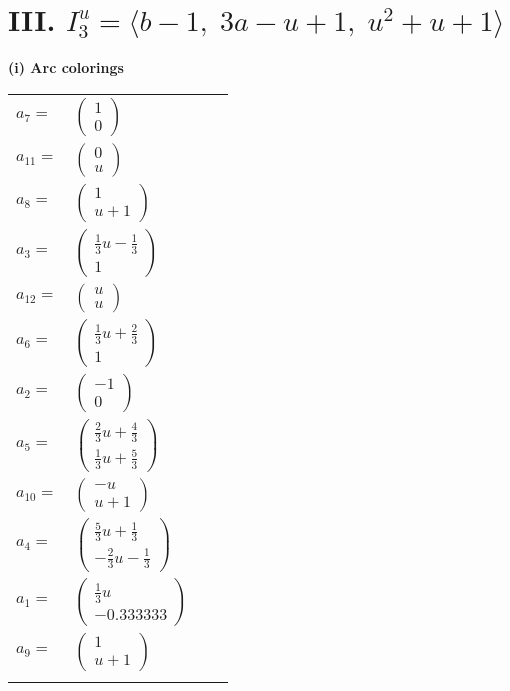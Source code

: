 \documentclass[1p]{elsarticle_modified}
\theoremstyle{definition}
\begin{document}
\centering \section*{III. $I^u_{3}= \langle b-1,\;3 a- u+1,\;u^2+u+1 \rangle$}
\flushleft \textbf{(i) Arc colorings}\\
\begin{tabular}{m{7pt} m{180pt} m{7pt} m{180pt} }
\flushright $a_{7}=$&$\begin{pmatrix}1\\0\end{pmatrix}$ \\
\flushright $a_{11}=$&$\begin{pmatrix}0\\u\end{pmatrix}$ \\
\flushright $a_{8}=$&$\begin{pmatrix}1\\u+1\end{pmatrix}$ \\
\flushright $a_{3}=$&$\begin{pmatrix}\frac{1}{3} u-\frac{1}{3}\\1\end{pmatrix}$ \\
\flushright $a_{12}=$&$\begin{pmatrix}u\\u\end{pmatrix}$ \\
\flushright $a_{6}=$&$\begin{pmatrix}\frac{1}{3} u+\frac{2}{3}\\1\end{pmatrix}$ \\
\flushright $a_{2}=$&$\begin{pmatrix}-1\\0\end{pmatrix}$ \\
\flushright $a_{5}=$&$\begin{pmatrix}\frac{2}{3} u+\frac{4}{3}\\\frac{1}{3} u+\frac{5}{3}\end{pmatrix}$ \\
\flushright $a_{10}=$&$\begin{pmatrix}- u\\u+1\end{pmatrix}$ \\
\flushright $a_{4}=$&$\begin{pmatrix}\frac{5}{3} u+\frac{1}{3}\\-\frac{2}{3} u-\frac{1}{3}\end{pmatrix}$ \\
\flushright $a_{1}=$&$\begin{pmatrix}\frac{1}{3} u\\-0.333333\end{pmatrix}$ \\
\flushright $a_{9}=$&$\begin{pmatrix}1\\u+1\end{pmatrix}$\\&\end{tabular}
\end{document}
